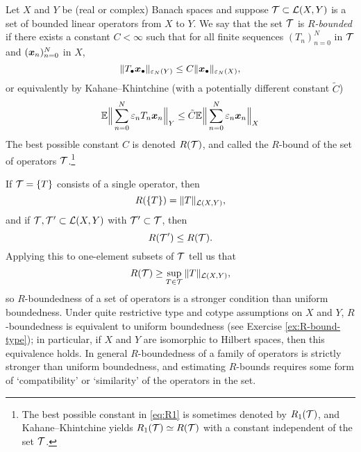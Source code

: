 \begin{defn}
  Let $X$ and $Y$ be (real or complex) Banach spaces and suppose $\mathcal{T} \subset \mathcal{L}(X,Y)$ is a set of bounded linear operators from $X$ to $Y$.
We say that the set $\mathcal{T}$ is \emph{$R$-bounded} if there exists a constant $C < \infty$ such that for all finite sequences $(T_{n})_{n=0}^{N}$ in $\mathcal{T}$ and $(\bm{x}_{n})_{n=0}^{N}$ in $X$,
\begin{equation*}
  \|T_{\bullet} \bm{x}_{\bullet}\|_{\varepsilon_{N}(Y)} \leq C \|\bm{x}_{\bullet}\|_{\varepsilon_{N}(X)},
\end{equation*}
or equivalently by Kahane--Khintchine (with a potentially different constant $\tilde{C}$)
\begin{equation}\label{eq:R1}
  \mathbb{E} \Big\| \sum_{n=0}^{N} \varepsilon_{n} T_{n} \bm{x}_{n} \Big\|_{Y} \leq \tilde{C} \mathbb{E} \Big\| \sum_{n=0}^{N} \varepsilon_{n}  \bm{x}_{n} \Big\|_{X}
\end{equation}
The best possible constant $C$ is denoted $R(\mathcal{T})$, and called the $R$-bound of the set of operators $\mathcal{T}$.\footnote{The best possible constant in \eqref{eq:R1} is sometimes denoted by $R_{1}(\mathcal{T})$, and Kahane--Khintchine yields $R_{1}(\mathcal{T}) \simeq R(\mathcal{T})$ with a constant independent of the set $\mathcal{T}$.}
\end{defn}

If $\mathcal{T} = \{T\}$ consists of a single operator, then
\begin{equation*}
  R(\{T\}) = \|T\|_{\mathcal{L}(X,Y)},
\end{equation*}
and if $\mathcal{T},\mathcal{T}' \subset \mathcal{L}(X,Y)$ with $\mathcal{T}' \subset \mathcal{T}$, then
\begin{equation*}
  R(\mathcal{T}') \leq R(\mathcal{T}).
\end{equation*}
Applying this to one-element subsets of $\mathcal{T}$ tell us that
\begin{equation*}
  R(\mathcal{T}) \geq \sup_{T \in \mathcal{T}} \|T\|_{\mathcal{L}(X,Y)},
\end{equation*}
so $R$-boundedness of a set of operators is a stronger condition than uniform boundedness.
Under quite restrictive type and cotype assumptions on $X$ and $Y$, $R$-boundedness is equivalent to uniform boundedness (see Exercise \ref{ex:R-bound-type}); in particular, if $X$ and $Y$ are isomorphic to Hilbert spaces, then this equivalence holds.
In general $R$-boundedness of a family of operators is strictly stronger than uniform boundedness, and estimating $R$-bounds requires some form of `compatibility' or `similarity' of the operators in the set.

